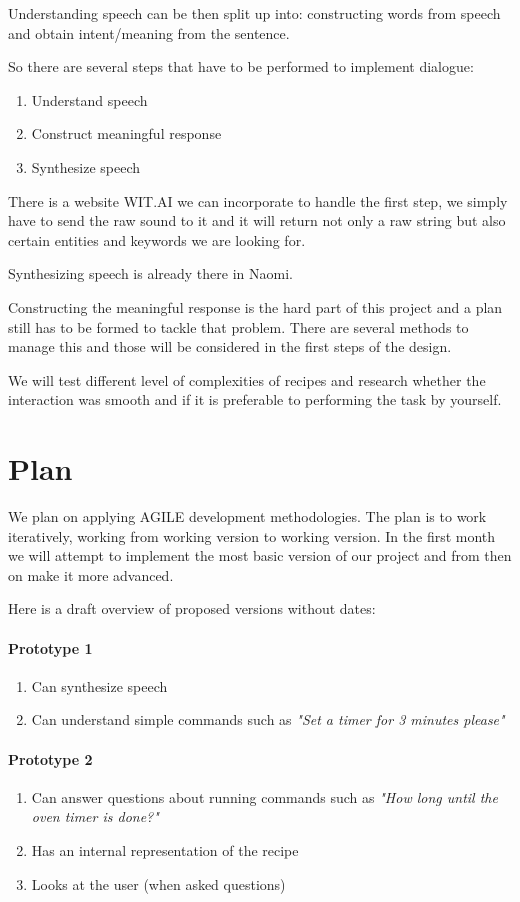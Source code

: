 \documentclass[11pt]{article} %
\begin{document}
Understanding speech can be then split up into: constructing words from speech and obtain intent/meaning from the sentence.

So there are several steps that have to be performed to implement dialogue:
\begin{enumerate}
\item Understand speech
\item Construct meaningful response
\item Synthesize speech
\end{enumerate}

There is a website WIT.AI we can incorporate to handle the first step, we simply have to send the raw sound to it and it will return not only a raw string but also certain entities and keywords we are looking for.

Synthesizing speech is already there in Naomi. 

Constructing the meaningful response is the hard part of this project and a plan still has to be formed to tackle that problem. There are several methods to manage this and those will be considered in the first steps of the design.

We will test different level of complexities of recipes and research whether the interaction was smooth and if it is preferable to performing the task by yourself.

\section{Plan}
We plan on applying AGILE development methodologies. The plan is to work iteratively, working from working version to working version. In the first month we will attempt to implement the most basic version of our project and from then on make it more advanced.

Here is a draft overview of proposed versions without dates:

\paragraph{Prototype 1}
\begin{enumerate}
\item Can synthesize speech
\item Can understand simple commands such as \emph{"Set a timer for 3 minutes please"}

\end{enumerate}

\paragraph{Prototype 2}
\begin{enumerate}
\item Can answer questions about running commands such as \emph{"How long until the oven timer is done?"}
\item Has an internal representation of the recipe
\item Looks at the user (when asked questions)

\end{enumerate}
\end{document}
